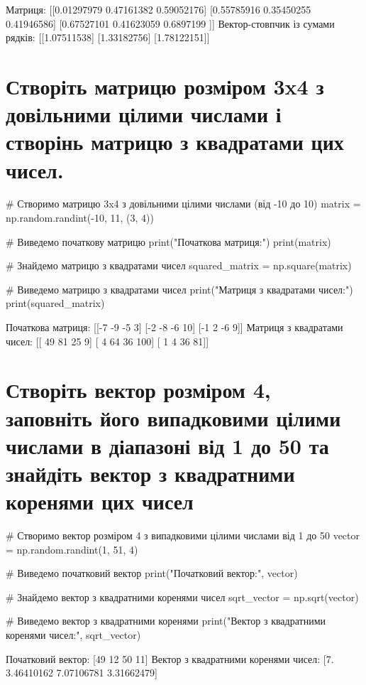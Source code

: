 \documentclass[]{article}
\newcounter{pythoncode}
\begin{document}
\begin{out}
	Матриця:
	[[0.01297979 0.47161382 0.59052176]
	 [0.55785916 0.35450255 0.41946586]
	 [0.67527101 0.41623059 0.6897199 ]]
	Вектор-стовпчик із сумами рядків:
	[[1.07511538]
	 [1.33182756]
	 [1.78122151]]
\end{out}

\section{Створіть матрицю розміром 3x4 з довільними цілими числами і створінь матрицю з квадратами цих чисел.}

\begin{pythoncode}
# Створимо матрицю 3x4 з довільними цілими числами (від -10 до 10)
matrix = np.random.randint(-10, 11, (3, 4))

# Виведемо початкову матрицю
print("Початкова матриця:")
print(matrix)

# Знайдемо матрицю з квадратами чисел
squared_matrix = np.square(matrix)

# Виведемо матрицю з квадратами чисел
print("Матриця з квадратами чисел:")
print(squared_matrix)
\end{pythoncode}

\begin{out}
	Початкова матриця:
	[[-7 -9 -5  3]
	 [-2 -8 -6 10]
	 [-1  2 -6  9]]
	Матриця з квадратами чисел:
	[[ 49  81  25   9]
	 [  4  64  36 100]
	 [  1   4  36  81]]
\end{out}

\section{Створіть вектор розміром 4, заповніть його випадковими цілими числами в діапазоні від 1 до 50 та знайдіть вектор з квадратними коренями цих чисел}

\begin{pythoncode}
    # Створимо вектор розміром 4 з випадковими цілими числами від 1 до 50
    vector = np.random.randint(1, 51, 4)

    # Виведемо початковий вектор
    print("Початковий вектор:", vector)

    # Знайдемо вектор з квадратними коренями чисел
    sqrt_vector = np.sqrt(vector)

    # Виведемо вектор з квадратними коренями
    print("Вектор з квадратними коренями чисел:", sqrt_vector)
\end{pythoncode}

\begin{out}
	Початковий вектор: [49 12 50 11]
	Вектор з квадратними коренями чисел: [7. 3.46410162 7.07106781 3.31662479]
\end{out}
\end{document}
